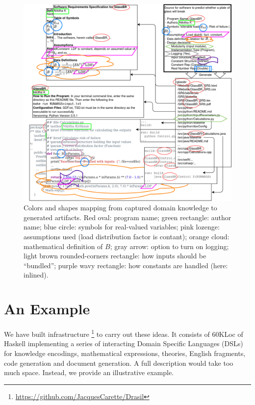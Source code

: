 \documentclass[a4paper,UKenglish,cleveref,autoref,thm-restate]{oasics-v2021}
\begin{document}
\begin{figure}[t!]
  \centering
  \includegraphics[width=\linewidth]{assets/DrasilSupportsChange-right-portrait-overlapped-ungrouped-11ptFont-squished-blind-v1-300dpi.png}
  \caption{Colors and shapes mapping from captured domain knowledge to generated
  artifacts. Red oval: program name; green rectangle: author name; blue circle:
  symbols for real-valued variables; pink lozenge: assumptions used (load 
  distribution factor is contant);
  orange cloud: mathematical definition of $B$; gray arrow: option to turn on
  logging; light brown rounded-corners rectangle: how inputs should be ``bundled'';
  purple wavy rectangle: how constants are handled (here: inlined).}
  \label{Fig_DrasilAndChange}
\end{figure}

\section{An Example}
\label{sec:example}

We have built infrastructure%
\footnote{\url{https://github.com/JacquesCarette/Drasil}} 
to carry out these ideas. It consists of 60KLoc of Haskell
implementing a series of interacting Domain Specific Languages (DSLs) for
knowledge encodings, mathematical expressions, theories, English fragments,
code generation and document generation.  A full description would take too
much space.  Instead, we provide an illustrative example.
\end{document}
